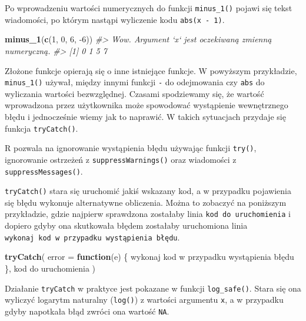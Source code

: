 \documentclass[paper=6in:9in,pagesize=pdftex,headinclude=on,footinclude=on,10pt]{scrbook}
\newenvironment{Shaded}{\begin{snugshade}}{\end{snugshade}}
\newcommand{\CommentTok}[1]{\textcolor[rgb]{0.56,0.35,0.01}{\textit{#1}}}
\newcommand{\ControlFlowTok}[1]{\textcolor[rgb]{0.13,0.29,0.53}{\textbf{#1}}}
\newcommand{\DataTypeTok}[1]{\textcolor[rgb]{0.13,0.29,0.53}{#1}}
\newcommand{\DecValTok}[1]{\textcolor[rgb]{0.00,0.00,0.81}{#1}}
\newcommand{\KeywordTok}[1]{\textcolor[rgb]{0.13,0.29,0.53}{\textbf{#1}}}
\newcommand{\NormalTok}[1]{#1}
\let\BeginKnitrBlock\begin \let\EndKnitrBlock\end
\begin{document}
Po wprowadzeniu wartości numerycznych do funkcji \texttt{minus\_1()} pojawi się tekst wiadomości, po którym nastąpi wyliczenie kodu \texttt{abs(x\ -\ 1)}.

\begin{Shaded}
\begin{Highlighting}[]
\KeywordTok{minus_1}\NormalTok{(}\KeywordTok{c}\NormalTok{(}\DecValTok{1}\NormalTok{, }\DecValTok{0}\NormalTok{, }\DecValTok{6}\NormalTok{, }\DecValTok{-6}\NormalTok{))}
\CommentTok{#> Wow. Argument `x` jest oczekiwaną zmienną numeryczną.}
\CommentTok{#> [1] 0 1 5 7}
\end{Highlighting}
\end{Shaded}

Złożone funkcje opierają się o inne istniejące funkcje.
W powyższym przykładzie, \texttt{minus\_1()} używał, między innymi funkcji \texttt{-} do odejmowania czy \texttt{abs} do wyliczania wartości bezwzględnej.
Czasami spodziewamy się, że wartość wprowadzona przez użytkownika może spowodować wystąpienie wewnętrznego błędu i jednocześnie wiemy jak to naprawić.
W takich sytuacjach przydaje się funkcja \texttt{tryCatch()}.

\BeginKnitrBlock{rmdinfo}
R pozwala na ignorowanie wystąpienia błędu używając funkcji \texttt{try()}, ignorowanie ostrzeżeń z \texttt{suppressWarnings()} oraz wiadomości z \texttt{suppressMessages()}.
\EndKnitrBlock{rmdinfo}

\texttt{tryCatch()} stara się uruchomić jakiś wskazany kod, a w przypadku pojawienia się błędu wykonuje alternatywne obliczenia.
Można to zobaczyć na poniższym przykładzie, gdzie najpierw sprawdzona zostałaby linia \texttt{kod\ do\ uruchomienia} i dopiero gdyby ona skutkowała błędem zostałaby uruchomiona linia \texttt{wykonaj\ kod\ w\ przypadku\ wystąpienia\ błędu}.

\begin{Shaded}
\begin{Highlighting}[]
\KeywordTok{tryCatch}\NormalTok{(}
  \DataTypeTok{error =} \ControlFlowTok{function}\NormalTok{(e) \{}
\NormalTok{    wykonaj kod w przypadku wystąpienia błędu}
\NormalTok{  \},}
\NormalTok{  kod do uruchomienia }
\NormalTok{)}
\end{Highlighting}
\end{Shaded}

Działanie \texttt{tryCatch} w praktyce jest pokazane w funkcji \texttt{log\_safe()}.
Stara się ona wyliczyć logarytm naturalny (\texttt{log()}) z wartości argumentu \texttt{x}, a w przypadku gdyby napotkała błąd zwróci ona wartość \texttt{NA}.
\end{document}
